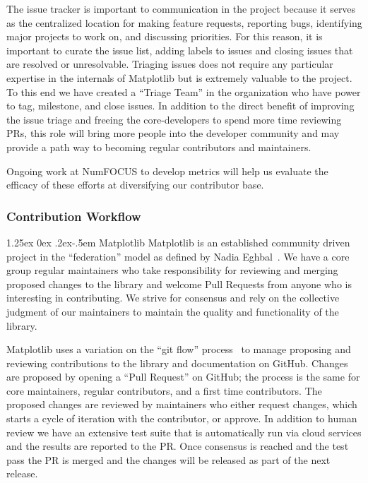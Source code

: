 \documentclass[12pt]{article}
\makeatletter
\numberwithin{page}{section}
\renewcommand{\paragraph}{%
  \@startsection{paragraph}{4}%
  {\z@}{1.25ex \@plus 0ex \@minus .2ex}{-.5em}%
  {\normalfont\normalsize\itshape\bfseries}%
}
\makeatother
\begin{document}
The issue tracker is important to communication in the project because
it serves as the centralized location for making feature requests,
reporting bugs, identifying major projects to work on, and discussing
priorities.  For this reason, it is important to curate the issue
list, adding labels to issues and closing issues that are resolved or
unresolvable. Triaging issues does not require any particular
expertise in the internals of Matplotlib but is extremely valuable to
the project.  To this end we have created a ``Triage Team'' in the
organization who have power to tag, milestone, and close issues.  In
addition to the direct benefit of improving the issue triage and
freeing the core-developers to spend more time reviewing PRs, this
role will bring more people into the developer community and may
provide a path way to becoming regular contributors and maintainers.

Ongoing work at NumFOCUS to develop metrics will help us evaluate the
efficacy of these efforts at diversifying our contributor base.

\subsubsection{Contribution Workflow}

\paragraph{Matplotlib}
Matplotlib is an established community driven project in the
``federation'' model as defined by Nadia Eghbal~\cite{eghbal_2020}.
We have a core group regular maintainers who take responsibility for
reviewing and merging proposed changes to the library and  welcome Pull
Requests from anyone who is interesting in contributing.  We strive
for consensus and rely on the collective judgment of our maintainers
to maintain the quality and functionality of the library.

Matplotlib uses a variation on the ``git flow'' process~\cite{ghflow}
to manage proposing and reviewing contributions to the library and
documentation on GitHub.  Changes are proposed by opening a ``Pull
Request'' on GitHub; the process is the same for core maintainers,
regular contributors, and a first time contributors.  The proposed
changes are reviewed by maintainers who either request changes, which
starts a cycle of iteration with the contributor, or approve.  In
addition to human review we have an extensive test suite that is
automatically run via cloud services and the results are reported to
the PR.  Once consensus is reached and the test pass the PR is merged
and the changes will be released as part of the next release.
\end{document}
